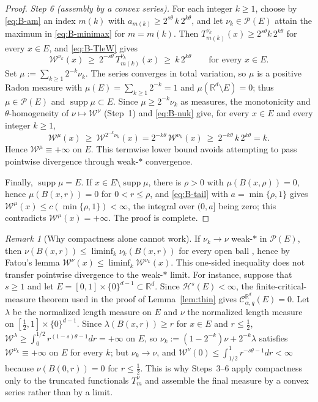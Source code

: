 \documentclass[12pt,oneside,a4paper]{article}
\theoremstyle{mytheorem}
\theoremstyle{remark}
\newtheorem{remark}[definition]{Remark}
\theoremstyle{definition}
\begin{document}
\begin{proof}
\smallskip\noindent\emph{Step 6 (assembly by a convex series).}
For each integer $k\geq1$, choose by \eqref{eq:B-am} an index $m(k)$ with
$a_{m(k)}\ge2^{s\theta}\,k\,2^{k\theta}$, and let
$\nu_k\in\mathcal{P}(E)$ attain the maximum in \eqref{eq:B-minimax}
for $m=m(k)$.  Then $T^{\nu_k}_{m(k)}(x)\ge2^{s\theta}k\,2^{k\theta}$
for every $x\in E$, and \eqref{eq:B-TleW} gives
\begin{equation}\label{eq:B-nuk}
 \mathcal{W}^{\nu_k}(x)\ \ge\ 2^{-s\theta}\,T^{\nu_k}_{m(k)}(x)
 \ \ge\ k\,2^{k\theta}
 \qquad\text{for every }x\in E.
\end{equation}
Set $\mu:=\sum_{k\ge1}2^{-k}\nu_k$.
The series converges in total variation, so $\mu$ is a positive Radon
measure with $\mu(E)=\sum_{k\geq1}2^{-k}=1$ and $\mu(\mathbb{R}^d\setminus E)=0$;
thus $\mu\in\mathcal{P}(E)$ and $\operatorname{supp}\mu\subset E$.
Since $\mu\ge2^{-k}\nu_k$ as measures, the monotonicity and
$\theta$-homogeneity of $\nu\mapsto\mathcal{W}^\nu$ (Step~1) and
\eqref{eq:B-nuk} give, for every $x\in E$ and every integer $k\geq1$,
\[
 \mathcal{W}^\mu(x)\ \ge\ \mathcal{W}^{2^{-k}\nu_k}(x)
 =2^{-k\theta}\,\mathcal{W}^{\nu_k}(x)\ \ge\ 2^{-k\theta}\,k\,2^{k\theta}=k.
\]
Hence $\mathcal{W}^\mu\equiv+\infty$ on $E$.  This termwise lower bound
avoids attempting to pass pointwise divergence through weak-\(*\)
convergence.

Finally, $\operatorname{supp}\mu=E$.  If $x\in E\setminus\operatorname{supp}\mu$,
there is $\rho>0$ with $\mu(B(x,\rho))=0$, hence $\mu(B(x,r))=0$ for
$0<r\le\rho$, and \eqref{eq:B-tail} with $a=\min\{\rho,1\}$ gives
$\mathcal{W}^\mu(x)\le c(\min\{\rho,1\})<\infty$, the integral over
$(0,a]$ being zero; this contradicts $\mathcal{W}^\mu(x)=+\infty$.
The proof is complete.
\end{proof}


\begin{remark}[Why compactness alone cannot work]\label{rem:B-compactness}
If $\nu_k\to\nu$ weak-\(*\) in $\mathcal{P}(E)$, then
$\nu(B(x,r))\le\liminf_k\nu_k(B(x,r))$ for every open ball
\cite[Ch.~II, Thm.~6.1(d)]{zbMATH03245885}, hence by Fatou's lemma
$\mathcal{W}^\nu(x)\le\liminf_k\mathcal{W}^{\nu_k}(x)$.  This one-sided
inequality does not transfer pointwise divergence to the weak-\(*\) limit.
For instance, suppose that $s\ge1$ and let
$E=[0,1]\times\{0\}^{d-1}\subset\mathbb{R}^d$.  Since
$\mathcal{H}^s(E)<\infty$, the finite-critical-measure theorem used in
the proof of Lemma~\ref{lem:thin} gives
$\mathcal{C}_{\alpha,q}^{\mathbb R^d}(E)=0$.  Let $\lambda$ be the normalized length
measure on $E$ and $\nu$ the normalized length measure on
$[\tfrac12,1]\times\{0\}^{d-1}$.  Since $\lambda(B(x,r))\ge r$ for $x\in E$ and
$r\le\tfrac12$, $\mathcal{W}^\lambda\ge\int_0^{1/2}r^{(1-s)\theta-1}dr=+\infty$
on $E$, so $\nu_k:=(1-2^{-k})\nu+2^{-k}\lambda$ satisfies
$\mathcal{W}^{\nu_k}\equiv+\infty$ on $E$ for every $k$; but $\nu_k\to\nu$,
and $\mathcal{W}^\nu(0)\le\int_{1/2}^1r^{-s\theta-1}dr<\infty$ because
$\nu(B(0,r))=0$ for $r\le\tfrac12$.  This is why Steps~3--6 apply
compactness only to the truncated functionals $T^\nu_m$ and assemble the
final measure by a convex series rather than by a limit.
\end{remark}
\end{document}

